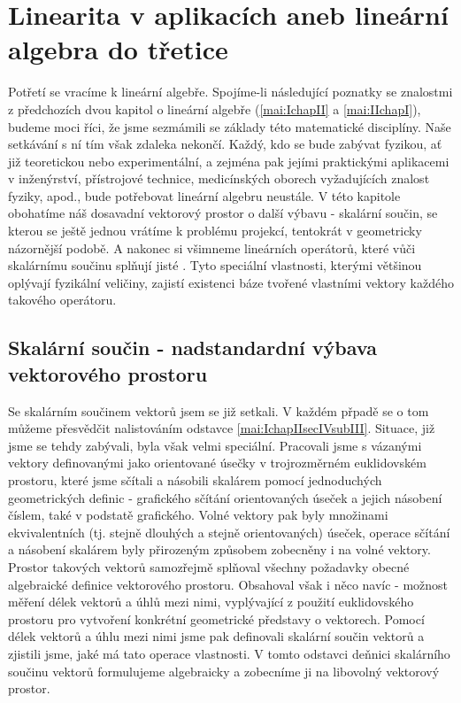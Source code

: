 \setchaptertoc
\chapter{Linearita v aplikacích aneb lineární algebra do třetice}\label{mai:IIchapIII}
  Potřetí se vracíme k lineární algebře. Spojíme-li následující poznatky se znalostmi z předchozích
  dvou kapitol o lineární algebře (\ref{mai:IchapII} a \ref{mai:IIchapI}), budeme moci říci, že jsme
  sezmámili se základy této matematické disciplíny. Naše setkávání s ní tím však zdaleka nekončí.
  Každý, kdo se bude zabývat fyzikou, ať již teoretickou nebo experimentální, a zejména pak jejími
  praktickými aplikacemi v inženýrství, přístrojové technice, medicínských oborech vyžadujících
  znalost fyziky, apod., bude potřebovat lineární algebru neustále. V této kapitole obohatíme náš
  dosavadní vektorový prostor o další výbavu - skalární součin, se kterou se ještě jednou vrátíme k
  problému projekcí, tentokrát v geometricky názornější podobě. A nakonec si všimneme lineárních
  operátorů, které vůči skalárnímu součinu splňují jisté . Tyto speciální
  vlastnosti, kterými většinou oplývají fyzikální  veličiny, zajistí existenci báze
  tvořené vlastními vektory každého takového operátoru. 

  \section{Skalární součin - nadstandardní výbava vektorového prostoru}\label{mai:IIchapIIIsecI}
    Se skalárním  součinem vektorů jsem se již setkali. V každém přpadě se o tom můžeme přesvědčit
    nalistováním odstavce \ref{mai:IchapIIsecIVsubIII}. Situace, již jsme se tehdy zabývali, byla
    však velmi speciální. Pracovali jsme s vázanými vektory definovanými jako orientované úsečky v
    trojrozměrném euklidovském prostoru, které jsme sčítali a násobili skalárem pomocí jednoduchých
    geometrických definic - grafického sčítání orientovaných úseček a jejich násobení číslem, také v
    podstatě grafického. Volné vektory pak byly množinami ekvivalentních (tj. stejně dlouhých a
    stejně orientovaných) úseček, operace sčítání a násobení skalárem byly přirozeným způsobem
    zobecněny i na volné vektory. Prostor takových vektorů samozřejmě splňoval všechny požadavky
    obecné algebraické definice vektorového prostoru. Obsahoval však i něco navíc - možnost měření
    délek vektorů a úhlů mezi nimi, vyplývající z použití euklidovského prostoru pro vytvoření
    konkrétní geometrické představy o vektorech. Pomocí délek vektorů a úhlu mezi nimi jsme pak
    definovali skalární součin vektorů a zjistili jsme, jaké má tato operace vlastnosti. V tomto
    odstavci deňnici skalárního součinu vektorů formulujeme algebraicky a zobecníme ji na libovolný
    vektorový prostor. 

